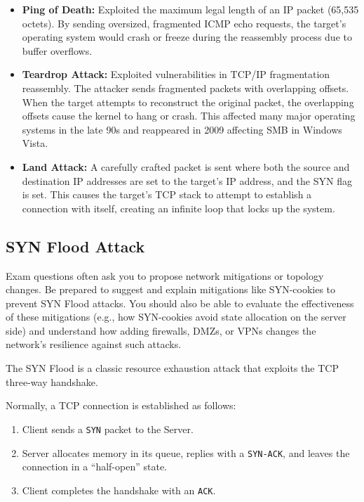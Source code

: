 \begin{itemize}
    \item \textbf{Ping of Death:} Exploited the maximum legal length of an IP packet (65,535 octets). By sending oversized, fragmented ICMP echo requests, the target's operating system would crash or freeze during the reassembly process due to buffer overflows.
    \item \textbf{Teardrop Attack:} Exploited vulnerabilities in TCP/IP fragmentation reassembly. The attacker sends fragmented packets with overlapping offsets. When the target attempts to reconstruct the original packet, the overlapping offsets cause the kernel to hang or crash. This affected many major operating systems in the late 90s and reappeared in 2009 affecting SMB in Windows Vista.
    \item \textbf{Land Attack:} A carefully crafted packet is sent where both the source and destination IP addresses are set to the target's IP address, and the SYN flag is set. This causes the target's TCP stack to attempt to establish a connection with itself, creating an infinite loop that locks up the system.
\end{itemize}

\subsection{SYN Flood Attack}

\begin{tcolorbox}[colback=blue!5!white,colframe=blue!75!black,title=Exam Insight]
Exam questions often ask you to propose network mitigations or topology changes. Be prepared to suggest and explain mitigations like SYN-cookies to prevent SYN Flood attacks. You should also be able to evaluate the effectiveness of these mitigations (e.g., how SYN-cookies avoid state allocation on the server side) and understand how adding firewalls, DMZs, or VPNs changes the network's resilience against such attacks.
\end{tcolorbox}

The SYN Flood is a classic resource exhaustion attack that exploits the TCP three-way handshake.

Normally, a TCP connection is established as follows:
\begin{enumerate}
    \item Client sends a \texttt{SYN} packet to the Server.
    \item Server allocates memory in its queue, replies with a \texttt{SYN-ACK}, and leaves the connection in a ``half-open'' state.
    \item Client completes the handshake with an \texttt{ACK}.
\end{enumerate}

